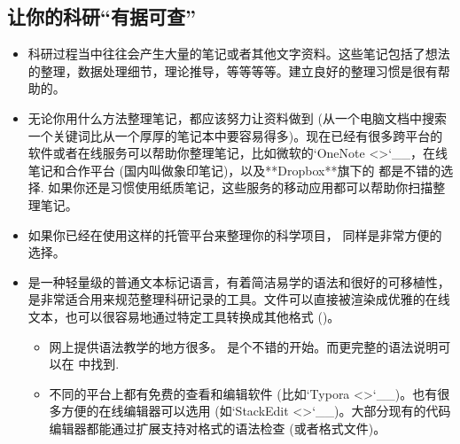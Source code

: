 \documentclass[letterpaper,10pt,english]{sphinxmanual}
\begin{document}
\subsection{让你的科研“有据可查”}
\label{\detokenize{resource/research/getting_started_cn:id9}}\begin{itemize}
\item {} 
科研过程当中往往会产生大量的笔记或者其他文字资料。这些笔记包括了想法的整理，数据处理细节，理论推导，等等等等。建立良好的整理习惯是很有帮助的。

\item {} 
无论你用什么方法整理笔记，都应该努力让资料做到
(从一个电脑文档中搜索一个关键词比从一个厚厚的笔记本中要容易得多)。现在已经有很多跨平台的软件或者在线服务可以帮助你整理笔记，比如微软的{}`OneNote \textless{}\textgreater{}{}`\_\_，在线笔记和合作平台
(国内叫做象印笔记)，以及**Dropbox**旗下的
都是不错的选择.
如果你还是习惯使用纸质笔记，这些服务的移动应用都可以帮助你扫描整理笔记。

\item {} 
如果你已经在使用这样的托管平台来整理你的科学项目，
同样是非常方便的选择。

\item {} 
是一种轻量级的普通文本标记语言，有着简洁易学的语法和很好的可移植性，是非常适合用来规范整理科研记录的工具。文件可以直接被渲染成优雅的在线文本，也可以很容易地通过特定工具转换成其他格式
()。
\begin{itemize}
\item {} 
网上提供语法教学的地方很多。
是个不错的开始。而更完整的语法说明可以在
 中找到.

\item {} 
不同的平台上都有免费的查看和编辑软件
(比如{}`Typora \textless{}\textgreater{}{}`\_\_)。也有很多方便的在线编辑器可以选用
(如{}`StackEdit \textless{}\textgreater{}{}`\_\_)。大部分现有的代码编辑器都能通过扩展支持对格式的语法检查
(或者格式文件)。

\end{itemize}

\end{itemize}
\end{document}
